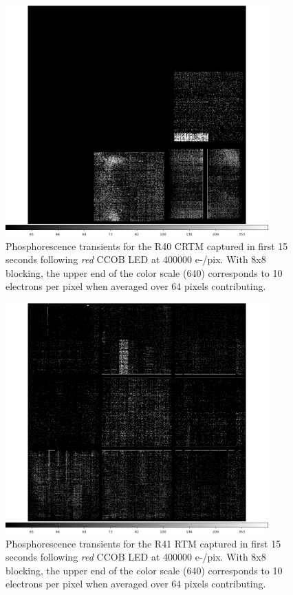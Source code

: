 \begin{figure}[!htbp]
\centering
\includegraphics[width=0.9\textwidth]{sections/figures/phosphorescence-survey/itl_fluor_R40_0-19_rb1_log.png}
\caption{Phosphorescence transients for the R40 CRTM captured in first 15 seconds following {\it red} CCOB LED at 400000 e-/pix. With 8x8 blocking, the upper end of the color scale (640) corresponds to 10 electrons per pixel when averaged over 64 pixels contributing.}
\label{fig:phos:R40}
\end{figure}

\begin{figure}[!htbp]
\centering
\includegraphics[width=0.9\textwidth]{sections/figures/phosphorescence-survey/itl_fluor_R41_0-19_rb1_log.png}
\caption{Phosphorescence transients for the R41 RTM captured in first 15 seconds following {\it red} CCOB LED at 400000 e-/pix. With 8x8 blocking, the upper end of the color scale (640) corresponds to 10 electrons per pixel when averaged over 64 pixels contributing.}
\label{fig:phos:R41}
\end{figure}

